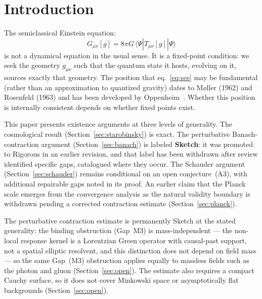 \documentclass[12pt,a4paper]{article}
\begin{document}
\section{Introduction}

The semiclassical Einstein equation:
\begin{equation}
G_{\mu\nu}[g] = 8\pi G\,\langle\Psi|\hat{T}_{\mu\nu}[g]|\Psi\rangle
\label{eq:sce}
\end{equation}
is not a dynamical equation in the usual sense. It is a fixed-point condition: we seek the
geometry $g_{\mu\nu}$ such that the quantum state it hosts, evolving on it, sources exactly
that geometry. The position that eq.~\eqref{eq:sce} may be fundamental (rather than an
approximation to quantized gravity) dates to M\o ller (1962) and Rosenfeld (1963) and has
been developed by Oppenheim~\cite{oppenheim}. Whether this position is internally
consistent depends on whether fixed points exist.

This paper presents existence arguments at three levels of generality. The cosmological
result (Section~\ref{sec:starobinsky}) is exact. The perturbative Banach-contraction
argument (Section~\ref{sec:banach}) is labeled \textbf{Sketch}: it was promoted to
Rigorous in an earlier revision, and that label has been withdrawn after review identified
specific gaps, catalogued where they occur. The Schauder argument
(Section~\ref{sec:schauder}) remains conditional on an open conjecture~(A3), with
additional repairable gaps noted in its proof. An earlier claim that the Planck scale
emerges from the convergence analysis as the natural validity boundary is withdrawn
pending a corrected contraction estimate (Section~\ref{sec:planck}).

\medskip\noindent The perturbative contraction estimate is permanently Sketch at the stated generality: the binding obstruction (Gap~M3) is mass-independent --- the non-local response kernel is a Lorentzian Green operator with causal-past support, not a spatial elliptic resolvent, and this distinction does not depend on field mass --- so the same Gap~(M3) obstruction applies equally to massless fields such as the photon and gluon (Section~\ref{sec:open}). The estimate also requires a compact Cauchy surface, so it does not cover Minkowski space or asymptotically flat backgrounds (Section~\ref{sec:open}).

\end{document}
